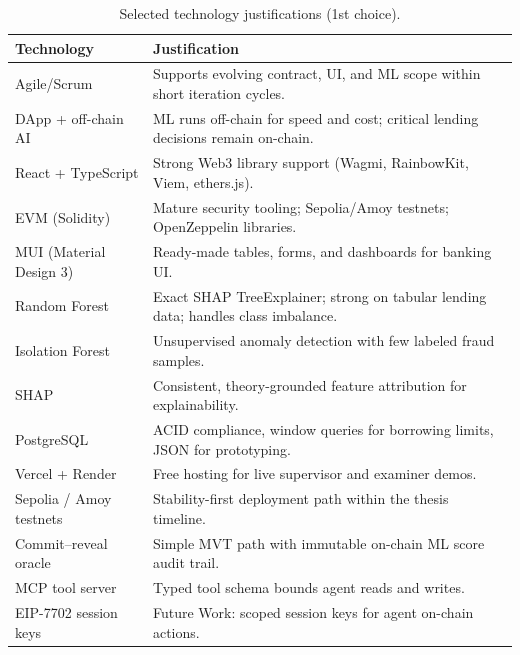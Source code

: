 \documentclass[12pt,a4paper]{report}
\newcommand{\tableheadcolor}{\rowcolor{TableHeadBg}}
\begin{document}
\begin{table}[H]
\centering
\caption[Selected technology justifications]{Selected technology justifications (1st choice).}
\label{tab:tech-justification-selected}
\small
\begin{tabular}{@{}p{3.2cm}p{9.8cm}@{}}
\toprule
\tableheadcolor
\textbf{Technology} & \textbf{Justification} \\
\midrule
Agile/Scrum & Supports evolving contract, UI, and ML scope within short iteration cycles. \\
DApp + off-chain AI & ML runs off-chain for speed and cost; critical lending decisions remain on-chain. \\
React + TypeScript & Strong Web3 library support (Wagmi, RainbowKit, Viem, ethers.js). \\
EVM (Solidity) & Mature security tooling; Sepolia/Amoy testnets; OpenZeppelin libraries. \\
MUI (Material Design 3) & Ready-made tables, forms, and dashboards for banking UI. \\
Random Forest & Exact SHAP TreeExplainer; strong on tabular lending data; handles class imbalance. \\
Isolation Forest & Unsupervised anomaly detection with few labeled fraud samples. \\
SHAP & Consistent, theory-grounded feature attribution for explainability. \\
PostgreSQL & ACID compliance, window queries for borrowing limits, JSON for prototyping. \\
Vercel + Render & Free hosting for live supervisor and examiner demos. \\
Sepolia / Amoy testnets & Stability-first deployment path within the thesis timeline. \\
Commit--reveal oracle & Simple MVT path with immutable on-chain ML score audit trail. \\
MCP tool server & Typed tool schema bounds agent reads and writes. \\
EIP-7702 session keys & Future Work: scoped session keys for agent on-chain actions. \\
\bottomrule
\end{tabular}
\end{table}
\end{document}
